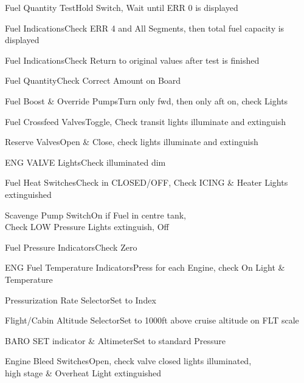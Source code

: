 \documentclass[sim-use, blue_items]{checklist}
\begin{document}
\begin{continuedchecklist}
	 {
		\item{Fuel Quantity Test}{Hold Switch, Wait until ERR 0 is displayed}
		\item{Fuel Indications}{Check ERR 4 and All Segments, then total fuel capacity is displayed}
		\item{Fuel Indications}{Check Return to original values after test is finished}
		\item{Fuel Quantity}{Check Correct Amount on Board}
		\item{Fuel Boost \& Override Pumps}{Turn only fwd, then only aft on, check Lights}
		\item{Fuel Crossfeed Valves}{Toggle, Check transit lights illuminate and extinguish}
		\item{Reserve Valves}{Open \& Close, check lights illuminate and extinguish}
		\item{ENG VALVE Lights}{Check illuminated dim}
		\item{Fuel Heat Switches}{Check in CLOSED/OFF, Check ICING \& Heater Lights extinguished}
		\item{Scavenge Pump Switch}{On if Fuel in centre tank,\\Check LOW Pressure Lights extinguish, Off}
		\item{Fuel Pressure Indicators}{Check Zero}
		\item{ENG Fuel Temperature Indicators}{Press for each Engine, check On Light \& Temperature} %
	}
	 {
		\item{Pressurization Rate Selector}{Set to Index}
		\item{Flight/Cabin Altitude Selector}{Set to 1000ft above cruise altitude on FLT scale}
		\item{BARO SET indicator \& Altimeter}{Set to standard Pressure}
	}
	\item{Engine Bleed Switches}{Open, check valve closed lights illuminated,\\high stage \& Overheat Light extinguished}

\end{continuedchecklist}
\end{document}
